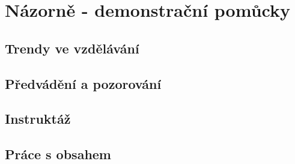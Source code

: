 \chapter{Názorně - demonstrační pomůcky}

\section{Trendy ve vzdělávání}

\section{Předvádění a pozorování}

\section{Instruktáž}

\section{Práce s obsahem}

\newpage